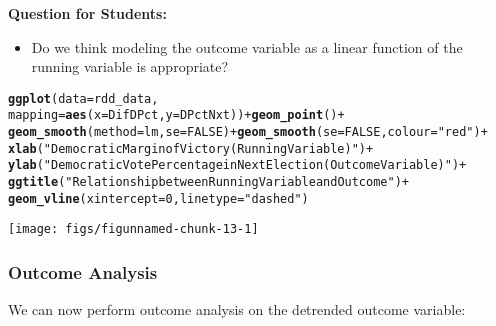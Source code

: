 \documentclass[11pt,leqno]{article}\usepackage[]{graphicx}\usepackage[]{color}
\makeatletter
\newcommand{\hlnum}[1]{\textcolor[rgb]{0.686,0.059,0.569}{#1}}%
\newcommand{\hlstr}[1]{\textcolor[rgb]{0.192,0.494,0.8}{#1}}%
\newcommand{\hlopt}[1]{\textcolor[rgb]{0,0,0}{#1}}%
\newcommand{\hlstd}[1]{\textcolor[rgb]{0.345,0.345,0.345}{#1}}%
\newcommand{\hlkwc}[1]{\textcolor[rgb]{0.333,0.667,0.333}{#1}}%
\newcommand{\hlkwd}[1]{\textcolor[rgb]{0.737,0.353,0.396}{\textbf{#1}}}%
\newenvironment{kframe}{%
 \def\at@end@of@kframe{}%
 \ifinner\ifhmode%
  \def\at@end@of@kframe{\end{minipage}}%
  \begin{minipage}{\columnwidth}%
 \fi\fi%
 \def\FrameCommand##1{\hskip\@totalleftmargin \hskip-\fboxsep
 \colorbox{shadecolor}{##1}\hskip-\fboxsep
     \hskip-\linewidth \hskip-\@totalleftmargin \hskip\columnwidth}%
 \MakeFramed {\advance\hsize-\width
   \@totalleftmargin\z@ \linewidth\hsize
   \@setminipage}}%
 {\par\unskip\endMakeFramed%
 \at@end@of@kframe}
\newenvironment{knitrout}{}{} %
\theoremstyle{newstyle}
\makeatother
\begin{document}
\vspace{5mm}
\textbf{Question for Students:}
\vspace{-5mm}
\begin{itemize}\itemsep1pt
\item Do we think modeling the outcome variable as a linear function of the running variable is appropriate?
\end{itemize}

\begin{knitrout}\footnotesize
{}\color{fgcolor}\begin{kframe}
\begin{alltt}
\hlkwd{ggplot}\hlstd{(}\hlkwc{data} \hlstd{= rdd_data,}
       \hlkwc{mapping} \hlstd{=} \hlkwd{aes}\hlstd{(}\hlkwc{x} \hlstd{= DifDPct,} \hlkwc{y} \hlstd{= DPctNxt))} \hlopt{+} \hlkwd{geom_point}\hlstd{()} \hlopt{+}
  \hlkwd{geom_smooth}\hlstd{(}\hlkwc{method} \hlstd{= lm,} \hlkwc{se} \hlstd{=} \hlnum{FALSE}\hlstd{)} \hlopt{+} \hlkwd{geom_smooth}\hlstd{(}\hlkwc{se} \hlstd{=} \hlnum{FALSE}\hlstd{,} \hlkwc{colour}\hlstd{=} \hlstr{"red"}\hlstd{)} \hlopt{+}
  \hlkwd{xlab}\hlstd{(}\hlstr{"Democratic Margin of Victory (Running Variable)"}\hlstd{)} \hlopt{+}
  \hlkwd{ylab}\hlstd{(}\hlstr{"Democratic Vote Percentage in Next Election (Outcome Variable)"}\hlstd{)} \hlopt{+}
  \hlkwd{ggtitle}\hlstd{(}\hlstr{"Relationship between Running Variable and Outcome"}\hlstd{)} \hlopt{+}
  \hlkwd{geom_vline}\hlstd{(}\hlkwc{xintercept} \hlstd{=} \hlnum{0}\hlstd{,} \hlkwc{linetype} \hlstd{=} \hlstr{"dashed"}\hlstd{)}
\end{alltt}
\end{kframe}
\texttt{[image: figs/figunnamed-chunk-13-1]} 

\end{knitrout}

\subsubsection{Outcome Analysis}

We can now perform outcome analysis on the detrended outcome variable:
\end{document}
